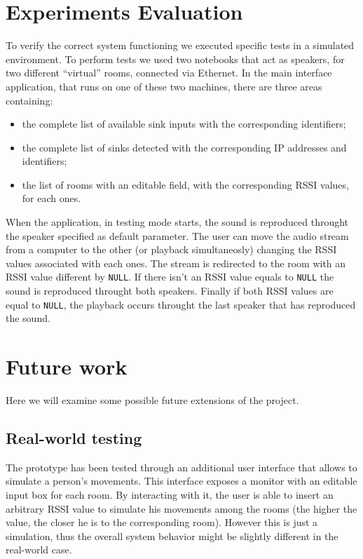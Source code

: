 \documentclass[conference]{IEEEtran}
\begin{document}
\section{Experiments Evaluation}
To verify the correct system functioning we executed specific tests in a simulated environment. To perform tests we used two notebooks that act as speakers, for two different ``virtual'' rooms, connected via Ethernet. In the main interface application, that runs on one of these two machines, there are three areas containing:
\begin{itemize}
\item the complete list of available sink inputs with the corresponding identifiers;
\item the complete list of sinks detected with the corresponding IP addresses and identifiers;
\item the list of rooms with an editable field, with the corresponding RSSI values, for each ones.
\end{itemize}
When the application, in testing mode starts, the sound is reproduced throught the speaker specified as default parameter. The user can move the audio stream from a computer to the other (or playback simultaneosly) changing the RSSI values associated with each ones. The stream is redirected to the room with an RSSI value different by \texttt{NULL}. If there isn't an RSSI value equals to \texttt{NULL} the sound is reproduced throught both speakers. Finally if both RSSI values are equal to \texttt{NULL}, the playback occurs throught the last speaker that has reproduced the sound.


\section{Future work}
Here we will examine some possible future extensions of the project.

\subsection{Real-world testing}
The prototype has been tested through an additional user interface that allows to simulate a person's movements. This interface exposes a monitor with an editable input box for each room. By interacting with it, the user is able to insert an arbitrary RSSI value to simulate his movements among the rooms (the higher the value, the closer he is to the corresponding room). However this is just a simulation, thus the overall system behavior might be slightly different in the real-world case.
\end{document}
